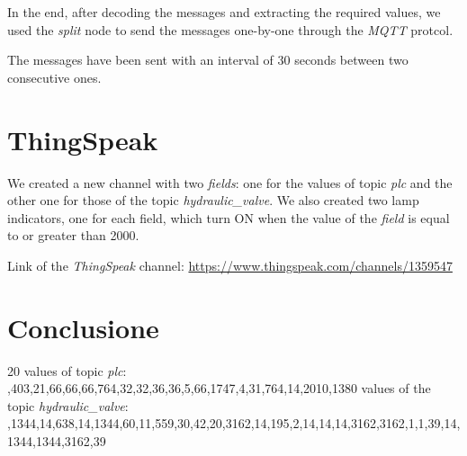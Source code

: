 \documentclass{article}
\begin{document}
In the end, after decoding the messages and extracting the required values, we used the \textit{split} node to send the messages one-by-one through the \textit{MQTT} protcol.\hfill \break 

The messages have been sent with an interval of 30 seconds between two consecutive ones.

\section{ThingSpeak}
We created a new channel with two \textit{fields}: one for the values of topic \textit{plc} and the other one for those of the topic \textit{hydraulic\_valve}. \hfill \break
We also created two lamp indicators, one for each field, which turn ON when the value of the \textit{field} is equal to or greater than 2000.

\hfill \break 
Link of the \textit{ThingSpeak} channel:  \href{https://www.thingspeak.com/channels/1359547}{https://www.thingspeak.com/channels/1359547}

\section{Conclusione}
20 values of topic \textit{plc}: \hfill{},403,21,66,66,66,764,32,32,36,36,5,66,1747,4,31,764,14,2010,1380 \hfill \break {} values of the topic \textit{hydraulic\_valve}: \hfill {},1344,14,638,14,1344,60,11,559,30,42,20,3162,14,195,2,14,14,14,3162,3162,1,1,39,14,1344,1344,3162,39
\end{document}
